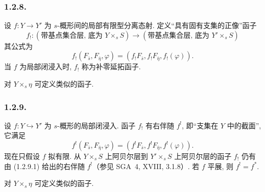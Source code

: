 \subsubsection*{1.2.8.}
设 $f:Y\longrightarrow Y'$ 为 $s$-概形间的局部有限型分离态射. 定义“具有固有支集的正像”函子
\begin{equation*}
f_!: (\text{带基点集合层, 底为 }Y\times_sS)
\longrightarrow
(\text{带基点集合层, 底为 }Y'\times_sS)
\end{equation*}
其公式为
\begin{equation}\tag{1.2.8.1}
f_!(F_{\bar s},F_{\bar\eta},\varphi)
=(f_!F_{\bar s},f_!F_{\bar\eta},f_!(\varphi)).
\end{equation}
当 $f$ 为局部闭浸入时, $f_!$ 称为补零延拓函子.

对 $Y\times_s\eta$ 可定义类似的函子.

\subsubsection*{1.2.9.}
设 $f:Y\hookrightarrow Y'$ 为 $s$-概形的局部闭浸入. 函子 $f_!$ 有右伴随 $f^!$, 即“支集在 $Y$ 中的截面”, 它满足
\begin{equation}\tag{1.2.9.1}
f^!(F_{\bar s},F_{\bar\eta},\varphi)
=(f^!F_{\bar s},f^!F_{\bar\eta},f^!(\varphi)).
\end{equation}
现在只假设 $f$ 拟有限. 从 $Y\times_sS$ 上阿贝尔层到 $Y'\times_sS$ 上阿贝尔层的函子 $f_!$ 仍有由 (1.2.9.1) 给出的右伴随 $f^!$（参见 SGA~4, XVIII, 3.1.8）. 若 $f$ 平展, 则 $f^!=f^*$.

对 $Y\times_s\eta$ 可定义类似的函子.
